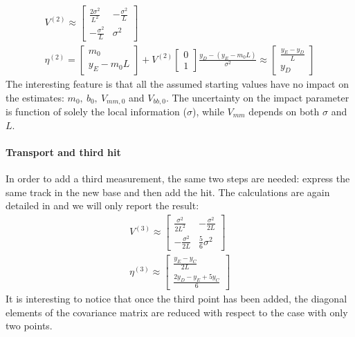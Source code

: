 \documentclass[12pt,a4paper,openright, oneside, titlepage]{book} %
\begin{document}
\begin{equation}
\begin{gathered}
V^{(2)}\approx
\begin{bmatrix}
\frac{2\sigma^2}{L^2} & -\frac{\sigma^2}{L} \\
-\frac{\sigma^2}{L} & \sigma^2
\end{bmatrix}\\
\eta^{(2)} = 
\begin{bmatrix} m_0 \\  y_E-m_0L \end{bmatrix} +
V^{(2)}
\begin{bmatrix} 0\\1 \end{bmatrix}
\frac{y_D-(y_E-m_0L)}{\sigma^2} \approx
\begin{bmatrix} \frac{y_E-y_D}{L} \\ y_D\end{bmatrix}
\end{gathered}
\label{eq_V2}
\end{equation}
The interesting feature is that all the assumed starting values have no impact on the estimates: $m_0,\ b_0,\ V_{mm,0}$ and $V_{bb,0}$. 
The uncertainty on the impact parameter is function of solely the local information ($\sigma$), 
while $V_{mm}$ depends on both $\sigma$ and $L$. 

\paragraph{Transport and third hit} 
In order to add a third measurement, 
the same two steps are needed: 
express the same track in the new base and then add the hit. 
The calculations are again detailed in \cite{KutschkePaper} and we will only report the result:
\begin{gather*}
V^{(3)}\approx
\begin{bmatrix}
\frac{\sigma^2}{2L^2} & -\frac{\sigma^2}{2L} \\
-\frac{\sigma^2}{2L} & \frac{5}{6}\sigma^2
\end{bmatrix}\\
\eta^{(3)} \approx
\begin{bmatrix} \frac{y_E-y_C}{2L} \\ \frac{2y_D-y_E+5y_C}{6}
\end{bmatrix}
\end{gather*}
It is interesting to notice that once the third point has been added, 
the diagonal elements of the covariance matrix are reduced with respect to the case with only two points. 
\end{document}
